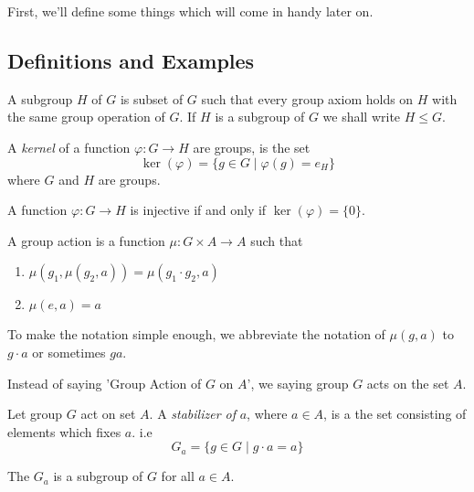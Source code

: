 First, we'll define some things which will come in handy later on.
\subsection{Definitions and Examples}

\begin{definition}
    A subgroup $H$ of $G$ is subset of $G$ such that every group axiom holds on $H$ with the same group operation of $G$.
    If $H$ is a subgroup of $G$ we shall write $H \le G$.
\end{definition}

\begin{definition}
    A \textit{kernel} of a function $\varphi : G \to H$ are groups, is the set 
    \[ \ker(\varphi) = \{ g \in G \mid \varphi(g)=e_H \} \]
    where $G$ and $H$ are groups.
\end{definition}

\begin{proposition}
    A function $\varphi : G \to H$ is injective if and only if 
    $\ker (\varphi) = \{0\} $.
\end{proposition}

\begin{definition}
    A group action is a function $\mu : G \times A \to A$ such that
    \begin{enumerate}
        \item $\mu(g_1, \mu(g_2,a))=\mu(g_1 \cdot g_2,a)$
        \item $\mu(e,a)=a$
    \end{enumerate}
    To make the notation simple enough, we abbreviate the notation of
    $\mu(g,a)$ to $g \cdot a$ or sometimes $ga$.    
\end{definition}

\begin{remark}
    Instead of saying 'Group Action of $G$ on $A$', we saying group $G$
    acts on the set $A$. 
\end{remark}

\begin{definition}
    Let group $G$ act on set $A$. 
    A \textit{stabilizer of} $a$, where $a \in A$, is a the set consisting of elements
    which fixes $a$. i.e
    \[ G_a = \{ g \in G \mid g \cdot a = a \} \]
\end{definition}

\begin{proposition}
    The $G_a$ is a subgroup of $G$ for all $a \in A$.
\end{proposition}

